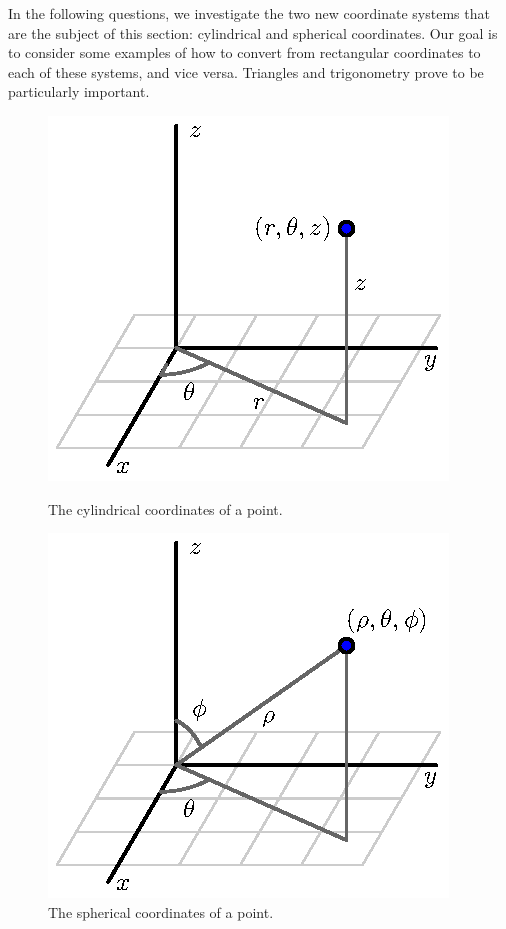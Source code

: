 \begin{pa} \label{PA:11.8}  In the following questions, we investigate the two new coordinate systems that are the subject of this section:  cylindrical and spherical coordinates.  Our goal is to consider some examples of how to convert from rectangular coordinates to each of these systems, and vice versa.  Triangles and trigonometry prove to be particularly important.
\begin{figure}[ht]
\begin{center}
\begin{minipage}{2.5in}
\begin{center}
  \includegraphics{figures/fig_11_8_cylindrical.eps}
\end{center}
\caption{The cylindrical coordinates of a point.}
\label{F:11.8.Cylindrical_coords}
\end{minipage} \hspace{0.5in}
\begin{minipage}{2.5in}
\begin{center}
  \includegraphics{figures/fig_11_8_spherical.eps}
\end{center}
\caption{The spherical coordinates of a point.}
\label{F:11.8.Spherical_coords}
\end{minipage}
\end{center}
\end{figure}


\end{pa}
